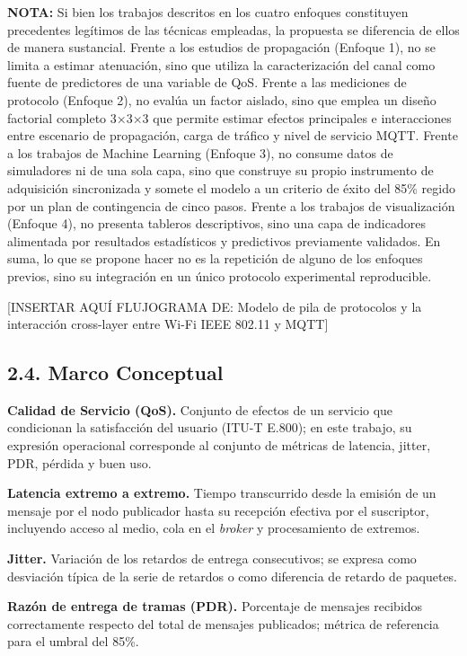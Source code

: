 \documentclass[
  12pt,
]{article}
\begin{document}
\textbf{NOTA:} Si bien los trabajos descritos en los cuatro enfoques
constituyen precedentes legítimos de las técnicas empleadas, la
propuesta se diferencia de ellos de manera sustancial. Frente a los
estudios de propagación (Enfoque 1), no se limita a estimar atenuación,
sino que utiliza la caracterización del canal como fuente de predictores
de una variable de QoS. Frente a las mediciones de protocolo (Enfoque
2), no evalúa un factor aislado, sino que emplea un diseño factorial
completo 3×3×3 que permite estimar efectos principales e interacciones
entre escenario de propagación, carga de tráfico y nivel de servicio
MQTT. Frente a los trabajos de Machine Learning (Enfoque 3), no consume
datos de simuladores ni de una sola capa, sino que construye su propio
instrumento de adquisición sincronizada y somete el modelo a un criterio
de éxito del 85\% regido por un plan de contingencia de cinco pasos.
Frente a los trabajos de visualización (Enfoque 4), no presenta tableros
descriptivos, sino una capa de indicadores alimentada por resultados
estadísticos y predictivos previamente validados. En suma, lo que se
propone hacer no es la repetición de alguno de los enfoques previos,
sino su integración en un único protocolo experimental reproducible.

{[}INSERTAR AQUÍ FLUJOGRAMA DE: Modelo de pila de protocolos y la
interacción cross-layer entre Wi-Fi IEEE 802.11 y MQTT{]}

\subsection{2.4. Marco Conceptual}\label{marco-conceptual}

\textbf{Calidad de Servicio (QoS).} Conjunto de efectos de un servicio
que condicionan la satisfacción del usuario (ITU-T E.800); en este
trabajo, su expresión operacional corresponde al conjunto de métricas de
latencia, jitter, PDR, pérdida y buen uso.

\textbf{Latencia extremo a extremo.} Tiempo transcurrido desde la
emisión de un mensaje por el nodo publicador hasta su recepción efectiva
por el suscriptor, incluyendo acceso al medio, cola en el \emph{broker}
y procesamiento de extremos.

\textbf{Jitter.} Variación de los retardos de entrega consecutivos; se
expresa como desviación típica de la serie de retardos o como diferencia
de retardo de paquetes.

\textbf{Razón de entrega de tramas (PDR).} Porcentaje de mensajes
recibidos correctamente respecto del total de mensajes publicados;
métrica de referencia para el umbral del 85\%.
\end{document}
